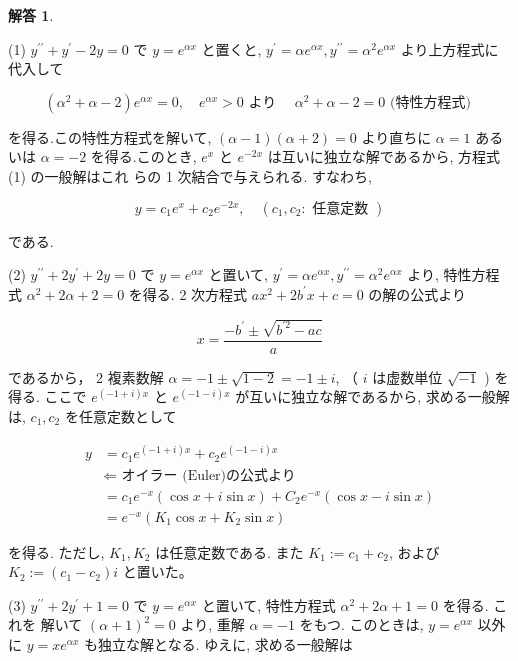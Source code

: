 \documentclass[10pt]{jsarticle}
\newtheorem*{answer*}{解答}
\begin{document}
\bigskip
\bigskip

\begin{answer*}
\end{answer*}

(1) $y^{\prime \prime}+y^{\prime}-2 y=0$ で $y=e^{\alpha x}$ と置くと, $y^{\prime}=\alpha e^{\alpha x}, y^{\prime \prime}=\alpha^{2} e^{\alpha x}$ より上方程式に代入して

$$
\left(\alpha^{2}+\alpha-2\right) e^{\alpha x}=0, \quad e^{\alpha x}>0 \text { より } \quad \alpha^{2}+\alpha-2=0 \text { (特性方程式) }
$$

を得る.この特性方程式を解いて, $(\alpha-1)(\alpha+2)=0$ より直ちに $\alpha=1$ あるいは $\alpha=-2$ を得る.このとき, $e^{x}$ と $e^{-2 x}$ は互いに独立な解であるから, 方程式 (1) の一般解はこれ らの 1 次結合で与えられる. すなわち,

$$
y=c_{1} e^{x}+c_{2} e^{-2 x}, \quad\left(c_{1}, c_{2}: \text { 任意定数 }\right)
$$

である.

(2) $y^{\prime \prime}+2 y^{\prime}+2 y=0$ で $y=e^{\alpha x}$ と置いて, $y^{\prime}=\alpha e^{\alpha x}, y^{\prime \prime}=\alpha^{2} e^{\alpha x}$ より, 特性方程式 $\alpha^{2}+2 \alpha+2=0$ を得る. 2 次方程式 $a x^{2}+2 b^{\prime} x+c=0$ の解の公式より

$$
x=\frac{-b^{\prime} \pm \sqrt{b^{\prime 2}-a c}}{a}
$$

であるから， $2$ 複素数解 $\alpha=-1 \pm \sqrt{1-2}=-1 \pm i$, （ $i$ は虚数単位 $\sqrt{-1}$ ) を得る. ここで $e^{(-1+i) x}$ と $e^{(-1-i) x}$ が互いに独立な解であるから, 求める一般解は, $c_{1}, c_{2}$ を任意定数として

$$
\begin{aligned}
y & =c_{1} e^{(-1+i) x}+c_{2} e^{(-1-i) x} \\
& \Longleftarrow \text { オイラー (Euler)の公式より } \\
& =c_{1} e^{-x}(\cos x+i \sin x)+C_{2} e^{-x}(\cos x-i \sin x) \\
& =e^{-x}\left(K_{1} \cos x+K_{2} \sin x\right)
\end{aligned}
$$

を得る. ただし, $K_{1}, K_{2}$ は任意定数である. また $K_{1}:=c_{1}+c_{2}$, および $K_{2}:=\left(c_{1}-c_{2}\right) i$ と置いた。

(3) $y^{\prime \prime}+2 y^{\prime}+1=0$ で $y=e^{\alpha x}$ と置いて, 特性方程式 $\alpha^{2}+2 \alpha+1=0$ を得る. これを 解いて $(\alpha+1)^{2}=0$ より, 重解 $\alpha=-1$ をもつ. このときは, $y=e^{\alpha x}$ 以外に $y=x e^{\alpha x}$ も独立な解となる. ゆえに, 求める一般解は
\end{document}

